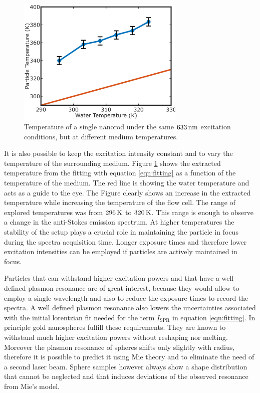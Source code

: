 \begin{figure}[tp] \centering
\includegraphics[width=80mm]{Chapters/04_Anti-Stokes/Figures/04_Extracted_Temp/04_extracted_temp.png}
\caption{Temperature of a single nanorod under the same $633\,\textrm{nm}$
excitation conditions, but at different medium temperatures. }
	\label{fig:AS-temps-rods}
\end{figure}

It is also possible to keep the excitation intensity constant and to vary the
temperature of the surrounding medium. Figure \ref{fig:AS-temps-rods} shows the
extracted temperature from the fitting with equation \ref{eqn:fitting} as a
function of the temperature of the medium. The red line is showing the water
temperature and acts as a guide to the eye. The Figure clearly shows an increase
in the extracted temperature while increasing the temperature of the flow cell.
The range of explored temperatures was from $296\,\textrm{K}$ to $320\,\textrm{K}$. This range is
enough to observe a change in the anti-Stokes emission spectrum. At higher
temperatures the stability of the setup plays a crucial role in maintaining the
particle in focus during the spectra acquisition time. Longer exposure times and
therefore lower excitation intensities can be employed if particles are actively
maintained in focus.

Particles that can withstand higher excitation powers and that have a
well-defined plasmon resonance are of great interest, because they would allow
to employ a single wavelength and also to reduce the exposure times to record
the spectra. A well defined plasmon resonance also lowers the uncertainties
associated with the initial lorentzian fit needed for the term $I_\textrm{SPR}$
in equation \ref{eqn:fitting}. In principle gold nanospheres fulfill these
requirements. They are known to withstand much higher excitation powers without
reshaping nor melting\cite{Hou2015}. Moreover the plasmon resonance of spheres
shifts only slightly with radius, therefore it is possible to predict it using
Mie theory and to eliminate the need of a second laser beam. Sphere samples
however always show a shape distribution that cannot be neglected\cite{Lee2013}
and that induces deviations of the observed resonance from Mie's model.

